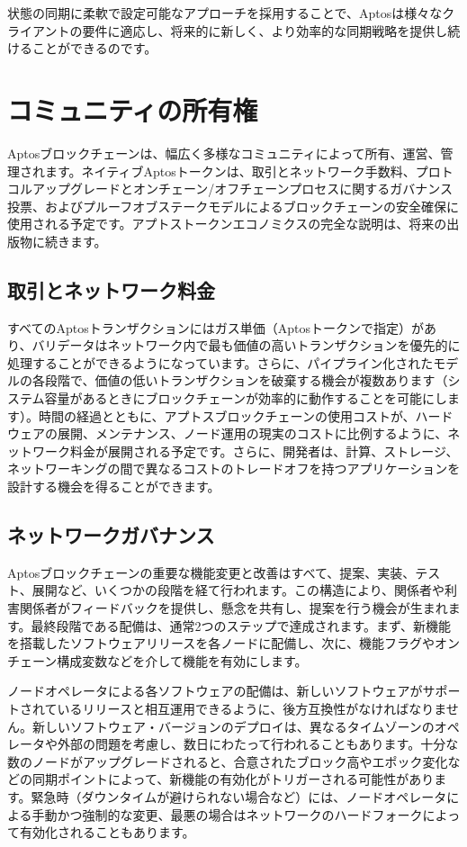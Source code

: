 \documentclass{article}
\begin{document}
状態の同期に柔軟で設定可能なアプローチを採用することで、Aptosは様々なクライアントの要件に適応し、将来的に新しく、より効率的な同期戦略を提供し続けることができるのです。

\section{コミュニティの所有権}
\label{sec:community_ownership}

Aptosブロックチェーンは、幅広く多様なコミュニティによって所有、運営、管理されます。ネイティブAptosトークンは、取引とネットワーク手数料、プロトコルアップグレードとオンチェーン/オフチェーンプロセスに関するガバナンス投票、およびプルーフオブステークモデルによるブロックチェーンの安全確保に使用される予定です。アプトストークンエコノミクスの完全な説明は、将来の出版物に続きます。

\subsection{取引とネットワーク料金}
\label{subsec:network_fees}

すべてのAptosトランザクションにはガス単価（Aptosトークンで指定）があり、バリデータはネットワーク内で最も価値の高いトランザクションを優先的に処理することができるようになっています。さらに、パイプライン化されたモデルの各段階で、価値の低いトランザクションを破棄する機会が複数あります（システム容量があるときにブロックチェーンが効率的に動作することを可能にします）。時間の経過とともに、アプトスブロックチェーンの使用コストが、ハードウェアの展開、メンテナンス、ノード運用の現実のコストに比例するように、ネットワーク料金が展開される予定です。さらに、開発者は、計算、ストレージ、ネットワーキングの間で異なるコストのトレードオフを持つアプリケーションを設計する機会を得ることができます。

\subsection{ネットワークガバナンス}
\label{subsec:network_governance}

Aptosブロックチェーンの重要な機能変更と改善はすべて、提案、実装、テスト、展開など、いくつかの段階を経て行われます。この構造により、関係者や利害関係者がフィードバックを提供し、懸念を共有し、提案を行う機会が生まれます。最終段階である配備は、通常2つのステップで達成されます。まず、新機能を搭載したソフトウェアリリースを各ノードに配備し、次に、機能フラグやオンチェーン構成変数などを介して機能を有効にします。

ノードオペレータによる各ソフトウェアの配備は、新しいソフトウェアがサポートされているリリースと相互運用できるように、後方互換性がなければなりません。新しいソフトウェア・バージョンのデプロイは、異なるタイムゾーンのオペレータや外部の問題を考慮し、数日にわたって行われることもあります。十分な数のノードがアップグレードされると、合意されたブロック高やエポック変化などの同期ポイントによって、新機能の有効化がトリガーされる可能性があります。緊急時（ダウンタイムが避けられない場合など）には、ノードオペレータによる手動かつ強制的な変更、最悪の場合はネットワークのハードフォークによって有効化されることもあります。
\end{document}
